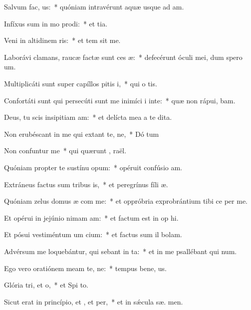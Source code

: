 \item Salvum  fac, us:~* quóniam intravérunt aquæ usque ad  am.
\item Infíxus sum in mo prodi:~* et   tia.
\item Veni in altidinem ris:~* et tem sit me.
\item Laborávi clamans, raucæ factæ sunt ces æ:~* defecérunt óculi mei, dum spero   um.
\item Multiplicáti sunt super capíllos pitis i,~* qui o  tis.
\item Confortáti sunt qui persecúti sunt me inimíci i inte:~* quæ non rápui,  bam.
\item Deus, tu scis insipitiam am:~* et delícta mea a te   dita.
\item Non erubéscant in me qui extant te, ne,~* Dó tum
\item Non confuntur  me~* qui quærunt ,  raël.
\item Quóniam propter te sustínu opum:~* opéruit confúsio  am.
\item Extráneus factus sum tribus is,~* et peregrínus fíli  æ.
\item Quóniam zelus domus æ com me:~* et oppróbria exprobrántium tibi ce per me.
\item Et opérui in jejúnio nimam am:~* et factum est in op hi.
\item Et pósui vestiméntum um cium:~* et factus sum il  bolam.
\item Advérsum me loquebántur, qui sebant in ta:~* et in me psallébant qui  num.
\item Ego vero oratiónem meam  te, ne:~* tempus bene, us.
\item Glória tri, et o,~* et Spi to.
\item Sicut erat in princípio, et , et per,~* et in sǽcula sæ. men.
